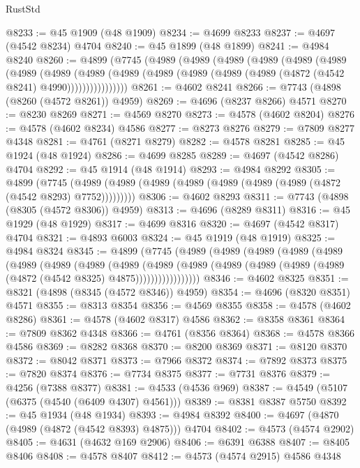 \begin{lexlean}{RustStd}
\begin{coremodule}
@8233 := @45 @1909 (@48 @1909)
@8234 := @4699 @8233
@8237 := @4697 (@4542 @8234) @4704
@8240 := @45 @1899 (@48 @1899)
@8241 := @4984 @8240
@8260 := @4899
    (@7745
      (@4989
        (@4989
          (@4989
            (@4989
              (@4989
                (@4989
                  (@4989
                    (@4989
                      (@4989
                        (@4989
                          (@4989 (@4989 (@4989 (@4989 (@4872 (@4542 @8241) @4990))))))))))))))))
@8261 := @4602 @8241
@8266 := @7743 (@4898 (@8260 (@4572 @8261)) @4959)
@8269 := @4696 (@8237 @8266) @4571
@8270 := @8230 @8269
@8271 := @4569 @8270
@8273 := @4578 (@4602 @8204)
@8276 := @4578 (@4602 @8234) @4586
@8277 := @8273 @8276
@8279 := @7809 @8277 @4348
@8281 := @4761 (@8271 @8279)
@8282 := @4578 @8281
@8285 := @45 @1924 (@48 @1924)
@8286 := @4699 @8285
@8289 := @4697 (@4542 @8286) @4704
@8292 := @45 @1914 (@48 @1914)
@8293 := @4984 @8292
@8305 := @4899
    (@7745 (@4989 (@4989 (@4989 (@4989 (@4989 (@4989 (@4989 (@4872 (@4542 @8293) @7752)))))))))
@8306 := @4602 @8293
@8311 := @7743 (@4898 (@8305 (@4572 @8306)) @4959)
@8313 := @4696 (@8289 @8311)
@8316 := @45 @1929 (@48 @1929)
@8317 := @4699 @8316
@8320 := @4697 (@4542 @8317) @4704
@8321 := @4893 @6003
@8324 := @45 @1919 (@48 @1919)
@8325 := @4984 @8324
@8345 := @4899
    (@7745
      (@4989
        (@4989
          (@4989
            (@4989
              (@4989
                (@4989
                  (@4989
                    (@4989
                      (@4989
                        (@4989
                          (@4989
                            (@4989 (@4989 (@4989 (@4989 (@4872 (@4542 @8325) @4875)))))))))))))))))
@8346 := @4602 @8325
@8351 := @8321 (@4898 (@8345 (@4572 @8346)) @4959)
@8354 := @4696 (@8320 @8351) @4571
@8355 := @8313 @8354
@8356 := @4569 @8355
@8358 := @4578 (@4602 @8286)
@8361 := @4578 (@4602 @8317) @4586
@8362 := @8358 @8361
@8364 := @7809 @8362 @4348
@8366 := @4761 (@8356 @8364)
@8368 := @4578 @8366 @4586
@8369 := @8282 @8368
@8370 := @8200 @8369
@8371 := @8120 @8370
@8372 := @8042 @8371
@8373 := @7966 @8372
@8374 := @7892 @8373
@8375 := @7820 @8374
@8376 := @7734 @8375
@8377 := @7731 @8376
@8379 := @4256 (@7388 @8377)
@8381 := @4533 (@4536 @969)
@8387 := @4549 (@5107 (@6375 (@4540 (@6409 @4307) @4561)))
@8389 := @8381 @8387 @5750
@8392 := @45 @1934 (@48 @1934)
@8393 := @4984 @8392
@8400 := @4697 (@4870 (@4989 (@4872 (@4542 @8393) @4875))) @4704
@8402 := @4573 (@4574 @2902)
@8405 := @4631 (@4632 @169 @2906)
@8406 := @6391 @6388
@8407 := @8405 @8406
@8408 := @4578 @8407
@8412 := @4573 (@4574 @2915) @4586 @4348

\end{coremodule}
\end{lexlean}
